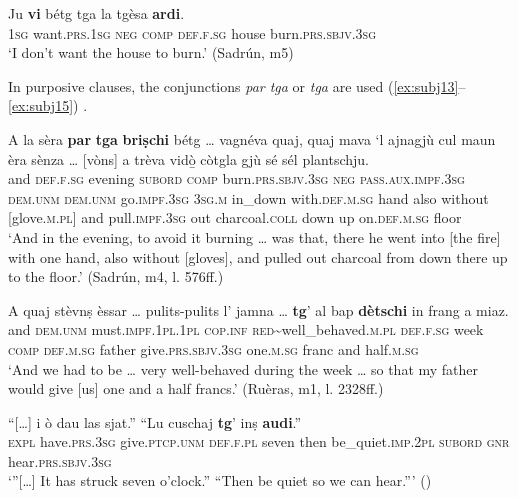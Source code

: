 \ea
\label{ex:subj12}
\gll Ju \textbf{vi} bétg tga la tgèsa \textbf{ardi}.\\
\textsc{1sg} want.\textsc{prs.1sg} \textsc{neg} \textsc{comp} \textsc{def.f.sg} house burn.\textsc{prs.sbjv.3sg}\\
\glt `I don't want the house to burn.' (Sadrún, m5)
\z

In purposive clauses, the conjunctions \textit{par tga} or \textit{tga} are used (\ref{ex:subj13}--\ref{ex:subj15}) .

\ea
\label{ex:subj13}
\gll  A la sèra \textbf{par} \textbf{tga} \textbf{briṣchi} bétg … vagnéva quaj, quaj mava `l ajnagjù cul maun èra sènza … [vòns] a trèva vidò̱ còtgla gjù sé sél plantschju.\\
and \textsc{def.f.sg} evening \textsc{subord} \textsc{comp} burn.\textsc{prs.sbjv.3sg} \textsc{neg} {} \textsc{pass.aux.impf.3sg} \textsc{dem.unm} \textsc{dem.unm} go.\textsc{impf.3sg} \textsc{3sg.m} in\_down with.\textsc{def.m.sg} hand also without {} [glove.\textsc{m.pl}] and pull.\textsc{impf.3sg} out charcoal.\textsc{coll} down up on.\textsc{def.m.sg} floor  \\
\glt `And in the evening, to avoid it burning … was that, there he went into [the fire] with one hand, also without [gloves], and pulled out charcoal from down there up to the floor.' (Sadrún, m4, l. 576ff.)
\z

\ea
\label{ex:subj14}
	\gll    A quaj stèvnṣ èssar … pulits-pulits l’ jamna … {\longrule} \textbf{tg}’ al bap \textbf{dètschi} in frang a miaz.\\
	and \textsc{dem.unm} must.\textsc{impf.1pl.1pl} \textsc{cop.inf} {} \textsc{red}\textasciitilde{well\_behaved}.\textsc{m.pl} \textsc{def.f.sg} week {} {}  \textsc{comp} \textsc{def.m.sg} father  give.\textsc{prs.sbjv.3sg} one.\textsc{m.sg} franc and half.\textsc{m.sg}\\
\glt `And we had to be … very well-behaved during the week … so that my father would give [us] one and a half francs.' (Ruèras, m1, l. 2328ff.)
\z

\ea
\label{ex:subj15}
\gll  “[…] i ò dau las sjat.” “Lu cuschaj {\longrule} \textbf{tg}’ inṣ  \textbf{audi}.”\\
     {} \textsc{expl} have.\textsc{prs.3sg} give.\textsc{ptcp.unm} \textsc{def.f.pl} seven then be\_quiet.\textsc{imp.2pl} {}  \textsc{subord} \textsc{gnr} hear.\textsc{prs.sbjv.3sg}\\
\glt `”[…] It has struck seven o’clock.” “Then be quiet so we can hear.”' (\citealt[87]{Gadola1935})
\z

